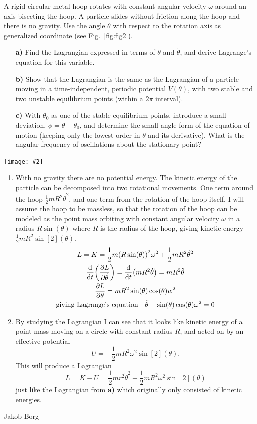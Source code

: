\documentclass[11pt,a4paper]{report}
\newcounter{excount}[chapter]
\newenvironment{exercise}[1][]{\addtocounter{excount}{1} \noindent {\bf Problem
    \arabic{excount} \ \ #1}\hspace{2mm}}{\vspace{4mm}}
\newenvironment{solution}
    {\begin{tcolorbox}[title=Solution,halign lower=right,breakable]
    }
    {
    \tcblower Jakob Borg
    \end{tcolorbox}
	\vspace{5mm}
    }
\newcommand{\fig}[2][]
{
\begin{center}
\texttt{[image: \#2]}
\captionof{figure}{#1}
\label{fig:fig\arabic{figure}}
\end{center}
}
\newcommand{\half}
{
\frac{1}{2}
}
\newcommand{\Lpdv}[1]
{
\pdv{L}{#1}
}
\newcommand{\dvtLpdv}[1]
{
\dv{t} \qty(\Lpdv{#1}) 
}
\newcommand{\dtheta}
{
\dot{\theta}
}
\newcommand{\ddtheta}
{
\ddot{\theta}
}
\newcommand{\cost}
{
\cos(\theta)
}
\newcommand{\sint}
{
\sin(\theta)
}
\begin{document}
\begin{exercise}
A rigid circular metal hoop rotates with constant angular velocity $\omega$ around an axis bisecting the hoop. A particle slides without friction along the hoop and there is no gravity. Use the angle $\theta$ with respect to the rotation axis as generalized coordinate (see Fig.~\ref{fig:fig2}).

\begin{itemize}
\item[\bf a)] Find the Lagrangian expressed in terms of $\theta$ and $\dot\theta$, and derive Lagrange's equation for this variable.
\item[\bf b)] Show that the Lagrangian is the same as the Lagrangian of a particle moving in a time-independent, periodic potential $V(\theta)$, with two stable and two unstable equilibrium points (within a $2\pi$ interval).
\item[\bf c)] With $\theta_0$ as one of the stable equilibrium points, introduce a small deviation, $\phi=\theta-\theta_0$, and determine the small-angle form of the equation of motion (keeping only the lowest order in $\theta$ and its derivative). What is the angular frequency of oscillations about the stationary point?
\end{itemize}
\begin{solution}
\fig[Rotating hoop.]{./figurer/{figurer.002}.png}
\begin{enumerate}[\bf a)]

\item With no gravity there are no potential energy. The kinetic energy of the particle can be decomposed into two rotational movements. One term around the hoop $\half m R^2 \dtheta^2$, and one term from the rotation of the hoop itself. I will assume the hoop to be massless, so that the rotation of the hoop can be modeled as the point mass orbiting with constant angular velocity $\omega$ in a radius $R\sint$ where $R$ is the radius of the hoop, giving kinetic energy $\half mR^2\sin[2](\theta)$.
\begin{gather*}
L = K = \half m \qty(R\sint)^2\omega^2 + \half mR^2\dtheta^2
\\
\dvtLpdv{\dtheta} = \dv{t}\qty( mR^2\dtheta ) = mR^2 \ddtheta
\\
\Lpdv{\theta} = mR^2\sint\cost w^2
\\
\qq*{giving Lagrange's equation} \ddtheta - \sint \cost \omega^2 = 0
\end{gather*}

\item By studying the Lagrangian I can see that it looks like kinetic energy of a point mass moving on a circle with constant radius $R$, and acted on by an effective potential $$U = - \half m R^2 \omega^2 \sin[2](\theta).$$ This will produce a Lagrangian $$L = K - U = \half mr^2\dtheta^2 +\half m R^2 \omega^2 \sin[2](\theta)$$ just like the Lagrangian from \textbf{a)} which originally only consisted of kinetic energies.


\end{enumerate}
\end{solution}
\end{exercise}
\end{document}
